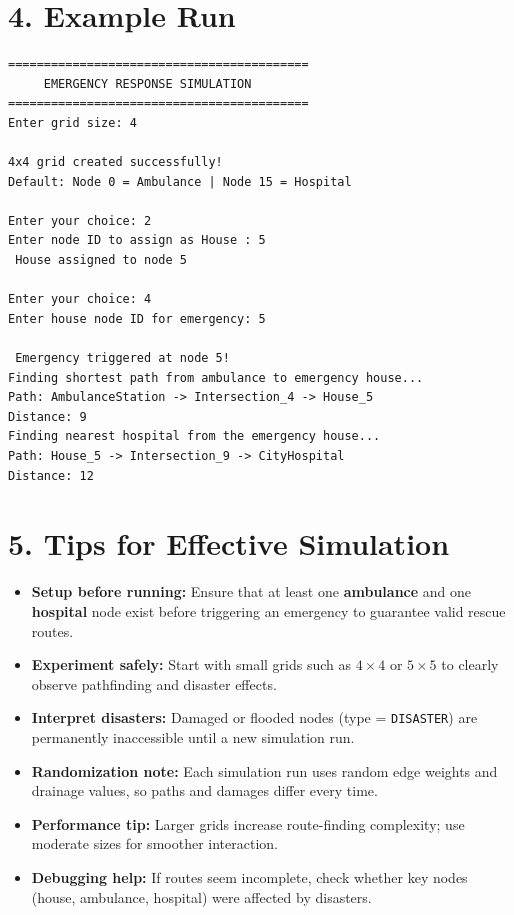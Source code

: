\documentclass[a4paper,12pt]{article}
\begin{document}
\section*{4. Example Run}
\begin{verbatim}
==========================================
     EMERGENCY RESPONSE SIMULATION
==========================================
Enter grid size: 4

4x4 grid created successfully!
Default: Node 0 = Ambulance | Node 15 = Hospital

Enter your choice: 2
Enter node ID to assign as House : 5
 House assigned to node 5

Enter your choice: 4
Enter house node ID for emergency: 5

 Emergency triggered at node 5!
Finding shortest path from ambulance to emergency house...
Path: AmbulanceStation -> Intersection_4 -> House_5
Distance: 9
Finding nearest hospital from the emergency house...
Path: House_5 -> Intersection_9 -> CityHospital
Distance: 12
\end{verbatim}

\section*{5. Tips for Effective Simulation}
\begin{itemize}
    \item \textbf{Setup before running:} Ensure that at least one \textbf{ambulance} and one \textbf{hospital} node exist before triggering an emergency to guarantee valid rescue routes.
    \item \textbf{Experiment safely:} Start with small grids such as $4\times4$ or $5\times5$ to clearly observe pathfinding and disaster effects.
    \item \textbf{Interpret disasters:} Damaged or flooded nodes (type = \texttt{DISASTER}) are permanently inaccessible until a new simulation run.
    \item \textbf{Randomization note:} Each simulation run uses random edge weights and drainage values, so paths and damages differ every time.
    \item \textbf{Performance tip:} Larger grids increase route-finding complexity; use moderate sizes for smoother interaction.
    \item \textbf{Debugging help:} If routes seem incomplete, check whether key nodes (house, ambulance, hospital) were affected by disasters.
\end{itemize}
\end{document}
